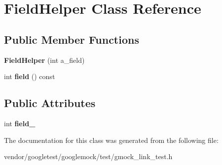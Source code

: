 \hypertarget{class_field_helper}{}\section{Field\+Helper Class Reference}
\label{class_field_helper}
\subsection*{Public Member Functions}
\begin{DoxyCompactItemize}
\item 
\mbox{\label{class_field_helper_a06729cbd5da2993e8007cb62f1d00b3a}} 
{\bfseries Field\+Helper} (int a\+\_\+field)
\item 
\mbox{\label{class_field_helper_af2959e142813205aeeb4d2ad27430ad3}} 
int {\bfseries field} () const
\end{DoxyCompactItemize}
\subsection*{Public Attributes}
\begin{DoxyCompactItemize}
\item 
\mbox{\label{class_field_helper_a50a7ec9efc60377363d5ce8bea1708ac}} 
int {\bfseries field\+\_\+}
\end{DoxyCompactItemize}


The documentation for this class was generated from the following file\+:\begin{DoxyCompactItemize}
\item 
vendor/googletest/googlemock/test/gmock\+\_\+link\+\_\+test.\+h\end{DoxyCompactItemize}
